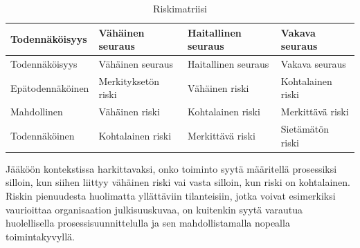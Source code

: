 \documentclass[
  finnish,
  letterpaper,
  DIV=11,
  numbers=noendperiod,
  oneside]{scrreprt}
\begin{document}
\begin{longtable}[]{@{}
  >{\raggedright\arraybackslash}p{}
  >{\raggedright\arraybackslash}p{}
  >{\raggedright\arraybackslash}p{}
  >{\raggedright\arraybackslash}p{}@{}}
\caption{Riskimatriisi}\label{tbl-riskimatriisi}\tabularnewline
\toprule\noalign{}
\begin{minipage}[b]{\linewidth}\raggedright
Todennäköisyys
\end{minipage} & \begin{minipage}[b]{\linewidth}\raggedright
Vähäinen seuraus
\end{minipage} & \begin{minipage}[b]{\linewidth}\raggedright
Haitallinen seuraus
\end{minipage} & \begin{minipage}[b]{\linewidth}\raggedright
Vakava seuraus
\end{minipage} \\
\midrule\noalign{}
\endfirsthead
\toprule\noalign{}
\begin{minipage}[b]{\linewidth}\raggedright
Todennäköisyys
\end{minipage} & \begin{minipage}[b]{\linewidth}\raggedright
Vähäinen seuraus
\end{minipage} & \begin{minipage}[b]{\linewidth}\raggedright
Haitallinen seuraus
\end{minipage} & \begin{minipage}[b]{\linewidth}\raggedright
Vakava seuraus
\end{minipage} \\
\midrule\noalign{}
\endhead
\bottomrule\noalign{}
\endlastfoot
Epätodennäköinen & Merkityksetön riski & Vähäinen riski & Kohtalainen
riski \\
Mahdollinen & Vähäinen riski & Kohtalainen riski & Merkittävä riski \\
Todennäköinen & Kohtalainen riski & Merkittävä riski & Sietämätön
riski \\
\end{longtable}

Jääköön kontekstissa harkittavaksi, onko toiminto syytä määritellä
prosessiksi silloin, kun siihen liittyy vähäinen riski vai vasta
silloin, kun riski on kohtalainen. Riskin pienuudesta huolimatta
yllättäviin tilanteisiin, jotka voivat esimerkiksi vaurioittaa
organisaation julkisuuskuvaa, on kuitenkin syytä varautua huolellisella
prosessisuunnittelulla ja sen mahdollistamalla nopealla toimintakyvyllä.
\end{document}
